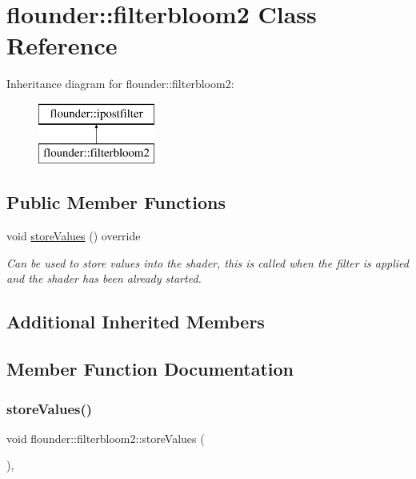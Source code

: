\hypertarget{classflounder_1_1filterbloom2}{}\section{flounder\+:\+:filterbloom2 Class Reference}
\label{classflounder_1_1filterbloom2}
Inheritance diagram for flounder\+:\+:filterbloom2\+:\begin{figure}[H]
\begin{center}
\leavevmode
\includegraphics[height=2.000000cm]{classflounder_1_1filterbloom2}
\end{center}
\end{figure}
\subsection*{Public Member Functions}
\begin{DoxyCompactItemize}
\item 
void \hyperlink{classflounder_1_1filterbloom2_a6439fc5d762213a5f780033d6b88428e}{store\+Values} () override
\begin{DoxyCompactList}\small\item\em Can be used to store values into the shader, this is called when the filter is applied and the shader has been already started. \end{DoxyCompactList}\end{DoxyCompactItemize}
\subsection*{Additional Inherited Members}


\subsection{Member Function Documentation}
\mbox{\label{classflounder_1_1filterbloom2_a6439fc5d762213a5f780033d6b88428e}} 
\subsubsection{\texorpdfstring{store\+Values()}{storeValues()}}
{\footnotesize\ttfamily void flounder\+::filterbloom2\+::store\+Values (\begin{DoxyParamCaption}{ }\end{DoxyParamCaption})\hspace{0.3cm}{\ttfamily [override]}, {\ttfamily [virtual]}}



